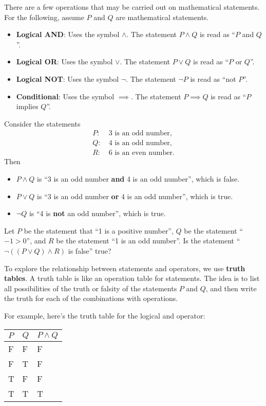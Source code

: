 There are a few operations that may be carried out on mathematical statements. For the following, assume $P$ and $Q$ are mathematical statements.
\begin{itemize}
    \item \textbf{Logical AND}: Uses the symbol $\land$. The statement $P\land Q$ is read as ``$P$ and $Q$''.
    \item \textbf{Logical OR}: Uses the symbol $\lor$. The statement $P\lor Q$ is read as ``$P$ or $Q$''.
    \item \textbf{Logical NOT}: Uses the symbol $\lnot$. The statement $\lnot P$ is read as ``not $P$''.
    \item \textbf{Conditional}: Uses the symbol $\implies$. The statement $P \implies Q$ is read as ``$P$ implies $Q$''.  
\end{itemize}
\begin{example}
    Consider the statements
    \begin{align*}
        P: &\ \text{3 is an odd number,}\\
        Q: &\ \text{4 is an odd number,}\\
        R: &\ \text{6 is an even number.}
    \end{align*}
    Then
    \begin{itemize}
        \item $P\land Q$ is ``3 is an odd number \textbf{and} 4 is an odd number'', which is false.
        \item $P\lor Q$ is ``3 is an odd number \textbf{or} 4 is an odd number'', which is true.
        \item $\lnot Q$ is ``4 is \textbf{not} an odd number'', which is true.
    \end{itemize}
\end{example}
\begin{exercise}
    Let $P$ be the statement that ``1 is a positive number'', $Q$ be the statement ``$-1 > 0$'', and $R$ be the statement ``1 is an odd number''. Is the statement ``$\lnot((P\lor Q)\land R)$ is false'' true?
\end{exercise}

To explore the relationship between statements and operators, we use \textbf{truth tables}. A truth table is like an operation table for statements. The idea is to list all possibilities of the truth or falsity of the statements $P$ and $Q$, and then write the truth for each of the combinations with operations.

For example, here's the truth table for the logical and operator:
\begin{table}[h]
    \centering
    \begin{tabular}{|l|l||l|}
        \hline
        $P$ & $Q$ & $P\land Q$ \\ \hline
        F   & F   & F          \\ \hline
        F   & T   & F          \\ \hline
        T   & F   & F          \\ \hline
        T   & T   & T          \\ \hline
    \end{tabular}
\end{table}

